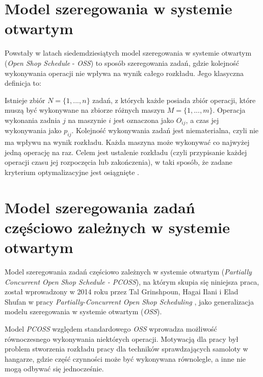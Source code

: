 \documentclass[brudnopis]{xmgr}
\begin{document}
\section{Model szeregowania w systemie otwartym}
\medskip

Powstały w latach siedemdziesiątych model szeregowania w systemie otwartym (\emph{Open Shop Schedule} - \emph{OSS}) to sposób szeregowania zadań, gdzie kolejność wykonywania operacji nie wpływa na wynik całego rozkładu. Jego klasyczna definicja to:
\medskip

Istnieje zbiór $N=\{1,...,n\}$ zadań, z których każde posiada zbiór operacji, które muszą być wykonywane na zbiorze różnych maszyn $M=\{1,...,m\}$. Operacja wykonania zadnia $j$ na maszynie $i$ jest oznaczona jako $O_{ij}$, a czas jej wykonywania jako $p_{ij}$.
Kolejność wykonywania zadań jest niematerialna, czyli nie ma wpływu na wynik rozkładu. Każda maszyna może wykonywać co najwyżej jedną operację na raz. Celem jest ustalenie rozkładu (czyli przypisanie każdej operacji czasu jej rozpoczęcia lub zakończenia), w taki sposób, że zadane kryterium optymalizacyjne jest osiągnięte \cite{ahmadian2020four}.
\medskip

\section{Model szeregowania zadań częściowo zależnych w systemie otwartym}
Model szeregowania zadań częściowo zależnych w systemie otwartym (\emph{Partially Concurrent Open Shop Schedule - PCOSS}), na którym skupia się niniejsza praca, został wprowadzony w 2014 roku przez Tal Grinshpoun, Hagai Ilani i Elad Shufan w pracy \emph{Partially-Concurrent Open Shop Scheduling} \cite{grinshpoun2014partially}, jako generalizacja modelu szeregowania w systemie otwartym (\emph{OSS}).\\
\medskip

Model \emph{PCOSS} względem standardowego \emph{OSS} wprowadza możliwość równoczesnego wykonywania niektórych operacji. Motywacją dla pracy był problem stworzenia rozkładu pracy dla techników sprawdzających samoloty w hangarze, gdzie część czynności może być wykonywana równolegle, a inne nie mogą odbywać się jednocześnie.
\end{document}
